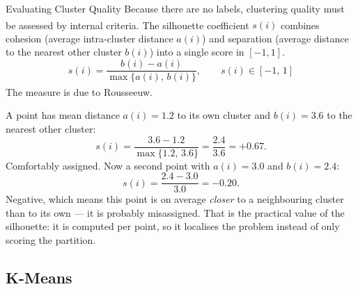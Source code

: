 \begin{v3topic}{Evaluating Cluster Quality}
    Because there are no labels, clustering quality must be assessed by internal criteria\textsuperscript{\cite[][pp.~443--445]{hanDataMiningConcepts2012}}. The silhouette coefficient $s(i)$ combines cohesion (average intra-cluster distance $a(i)$) and separation (average distance to the nearest other cluster $b(i)$) into a single score in $[-1, 1]$.
\visualseparator
    \begin{equation}
        s(i) = \frac{b(i) - a(i)}{\max\{a(i),\, b(i)\}}, \qquad s(i) \in [-1,\, 1]
        \label{eq:ml-silhouette}
    \end{equation}
    The measure is due to
    Rousseeuw\textsuperscript{\cite{rousseeuwSilhouettesGraphicalAid1987}}.

\begin{workedexample}
A point has mean distance $a(i) = 1.2$ to its own cluster and $b(i) = 3.6$ to
the nearest other cluster:
\[
  s(i) = \frac{3.6-1.2}{\max\{1.2,\,3.6\}} = \frac{2.4}{3.6} = +0.67 .
\]
Comfortably assigned. Now a second point with $a(i) = 3.0$ and $b(i) = 2.4$:
\[
  s(i) = \frac{2.4-3.0}{3.0} = -0.20 .
\]
Negative, which means this point is on average \emph{closer} to a neighbouring
cluster than to its own --- it is probably misassigned. That is the practical
value of the silhouette: it is computed per point, so it localises the problem
instead of only scoring the partition.
\end{workedexample}
\end{v3topic}

\subsection{K-Means}

